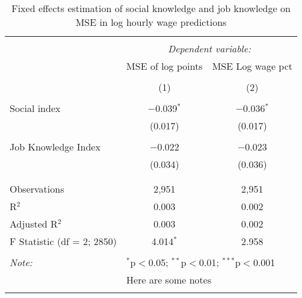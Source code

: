 
\begin{table}[!htbp] \centering 
  \caption{Fixed effects estimation of social knowledge and job knowledge on MSE in log hourly wage predictions} 
  \label{tab:panel_prediction} 
\begin{tabular}{@{\extracolsep{5pt}}lcc} 
\\[-1.8ex]\hline 
\hline \\[-1.8ex] 
 & \multicolumn{2}{c}{\textit{Dependent variable:}} \\ 
\cline{2-3} 
 & MSE of log points & MSE Log wage pct \\ 
\\[-1.8ex] & (1) & (2)\\ 
\hline \\[-1.8ex] 
 Social index & $-$0.039$^{*}$ & $-$0.036$^{*}$ \\ 
  & (0.017) & (0.017) \\ 
  & & \\ 
 Job Knowledge Index & $-$0.022 & $-$0.023 \\ 
  & (0.034) & (0.036) \\ 
  & & \\ 
\hline \\[-1.8ex] 
Observations & 2,951 & 2,951 \\ 
R$^{2}$ & 0.003 & 0.002 \\ 
Adjusted R$^{2}$ & 0.003 & 0.002 \\ 
F Statistic (df = 2; 2850) & 4.014$^{*}$ & 2.958 \\ 
\hline 
\hline \\[-1.8ex] 
\textit{Note:}  & \multicolumn{2}{l}{$^{*}$p$<$0.05; $^{**}$p$<$0.01; $^{***}$p$<$0.001} \\ 
 & \multicolumn{2}{l}{Here are some notes} \\ 
\normalsize 
\end{tabular} 
\end{table} 
